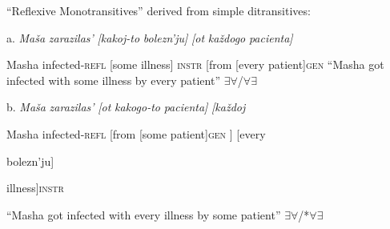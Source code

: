 \documentclass[output=paper,modfonts, nonflat]{langsci/langscibook}
\begin{document}
         “Reflexive Monotransitives” derived from simple ditransitives:

\begin{styleinnerExample}
a.  \textit{Maša}   \textit{zarazilas’}         \textit{[kakoj-to} \textit{bolezn’ju]} \textit{[ot}      \textit{každogo} \textit{pacienta]}
\end{styleinnerExample}

\begin{styleinnerExample}
  Masha infected-\textsc{refl}  [some illness] \textsc{instr} [from [every     patient]\textsc{gen} “Masha got infected with some illness by every patient” ${\exists}{\forall}$/${\forall}{\exists}$\\\end{styleinnerExample}

\begin{styleinnerExample}
b.  \textit{Maša}   \textit{zarazilas’}          \textit{[ot}      \textit{kakogo-to} \textit{pacienta]}      \textit{[každoj} 
\end{styleinnerExample}

\begin{styleinnerExample}
  Masha infected-\textsc{refl}   [from [some         patient]\textsc{gen} ] [every 
\end{styleinnerExample}

\begin{styleinnerExample}
  bolezn’ju]
\end{styleinnerExample}

\begin{styleinnerExample}
  illness]\textsc{instr}
\end{styleinnerExample}

\begin{styleinnerExample}
  “Masha got infected with every illness by some patient” ${\exists}{\forall}$/*${\forall}{\exists}$
\end{styleinnerExample}
\end{document}
